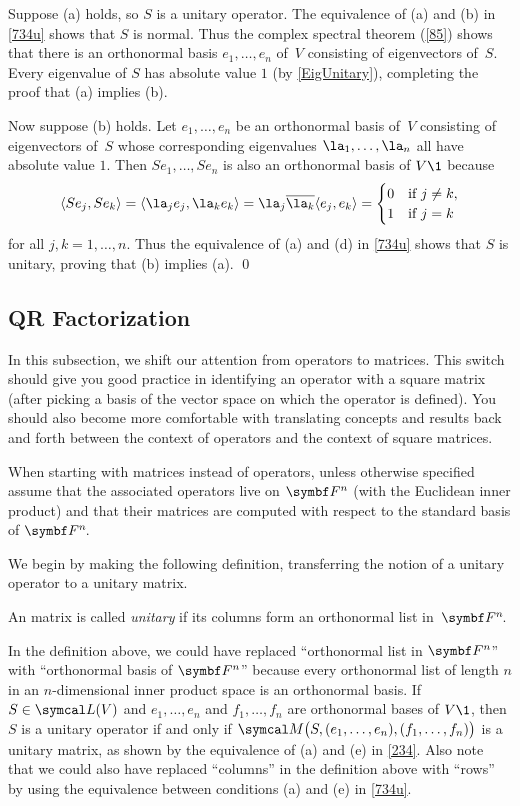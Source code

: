 \proof
Suppose (a) holds, so $S$ is a unitary operator. The equivalence of (a) and (b) in \ref{734u} shows that $S$ is normal. Thus the complex spectral theorem (\ref{85}) shows that there is an orthonormal basis $e_1, \dots, e_n$ of~$V$ consisting of  eigenvectors of~$S$. Every eigenvalue of $S$ has absolute value $1$ (by \ref{EigUnitary}), completing the proof that (a) implies (b).

Now suppose (b) holds. Let $e_1, \ldots, e_n$ be an orthonormal basis of~$V$ consisting of eigenvectors of~$S$ whose corresponding eigenvalues $\la_1, \ldots, \la_n$ all have absolute value $1$. Then
$Se_1, \ldots, Se_n$ is also an orthonormal basis of $V\1$ because
\[
\ip{Se_j, Se_k} = \ip{\la_j e_j, \la_k e_k} = \la_j \overline{\la_k} \ip{e_j, e_k}
= \begin{cases}
0 & \text{if } j \ne k, \\
1 & \text{if } j = k
\end{cases}
\]
for all $j,k = 1, \ldots, n$. Thus the equivalence of (a) and (d) in \ref{734u} shows that $S$ is unitary, proving that (b) implies (a).
\qed

\pagebreak[3]

\subsection{QR Factorization}

In this subsection, we shift our attention from operators to matrices. This switch should give you good practice in identifying an operator with a square matrix (after picking a basis of the vector space on which the operator is defined). You should also become more comfortable with translating concepts and results back and forth between the context of operators and the context of square matrices.

When starting with  matrices instead of operators, unless otherwise specified assume that the associated operators live on $\F{n}$ (with the Euclidean inner product) and that their matrices are computed with respect to the standard basis of $\FF{n}$.

We begin by making the following definition, transferring the notion of a unitary operator to a unitary matrix.

{An  matrix is called \emph{unitary} if its columns form an orthonormal list in~$\FF{n}$.}

In the definition above, we could have replaced ``orthonormal list in $\F{n}$'' with ``orthonormal basis of $\F{n}$'' because every orthonormal list of length $n$ in an $n$-dimensional inner product space is an orthonormal basis. If $S \in \L(V)$ and $e_1, \ldots, e_n$ and $f_1, \ldots, f_n$ are orthonormal bases of $V\1$, then $S$ is a unitary operator if and only if
$\M\paren[\big]{ S, (e_1, \ldots, e_n), (f_1, \ldots, f_n) }$ is a unitary matrix, as shown by the equivalence of (a) and (e) in \ref{234}.
Also note that we could also have replaced ``columns'' in the definition above with ``rows'' by using the equivalence between conditions (a) and (e) in \ref{734u}.

